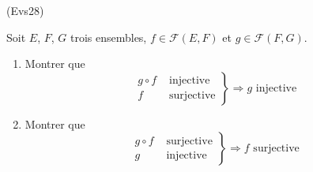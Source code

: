 \begin{tiny}(Evs28)\end{tiny} Soit $E$, $F$, $G$ trois ensembles, $f\in \mathcal{F}(E,F)$ et $g\in \mathcal{F}(F,G)$. 
\begin{enumerate}
 \item Montrer que 
\begin{displaymath}
\left. 
\begin{aligned}
 g\circ f &\text{ injective} \\ f &\text{ surjective}
\end{aligned}
\right\rbrace \Rightarrow g \text{ injective}
\end{displaymath}

 \item Montrer que 
\begin{displaymath}
\left. 
\begin{aligned}
 g\circ f &\text{ surjective} \\ g &\text{ injective}
\end{aligned}
\right\rbrace \Rightarrow f \text{ surjective}
\end{displaymath}
\end{enumerate}
